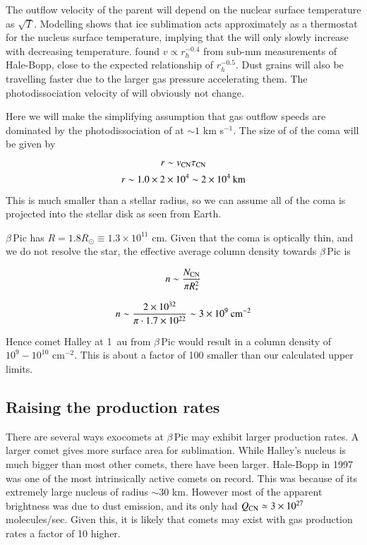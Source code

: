 \documentclass{aa}
\newcommand{\kms}{km s$^{-1}$}
\newcommand{\bp}{$\beta$\,Pic}
\begin{document}
The outflow velocity of the parent  will depend on the nuclear surface temperature as $\sqrt{T}$.
%
Modelling shows that ice sublimation acts approximately as a thermostat for the nucleus surface temperature, implying that the  will only slowly increase with decreasing temperature.
%
\citet{Biver99} found $v\propto r_h^{-0.4}$ from sub-mm measurements of Hale-Bopp, close to the expected relationship of $r_h^{-0.5}$.
%
Dust grains will also be travelling faster due to the larger gas pressure accelerating them.
%
The photodissociation velocity of  will obviously not change. 

Here we will make the simplifying assumption that gas outflow speeds are dominated by the photodissociation of  at $\sim 1$ \kms{}.
%
The size of of the  coma will be given by

$$r\sim v_{\ce{CN}} \tau_{\ce{CN}}$$
$$r\sim 1.0 \times 2\times 10^{4}\sim 2\times 10^{4}\:{\rm km}$$

This is much smaller than a stellar radius, so we can assume all of the coma is projected into the stellar disk as seen from Earth.

\bp{} has $R=1.8R_\odot\equiv 1.3\times 10^{11}$ cm.
%
Given that the coma is optically thin, and we do not resolve the star, the effective average column density towards \bp{} is 

$$n\sim\frac{N_{\ce{CN}}}{\pi R_*^2}$$

$$n\sim\frac{2\times10^{32}}{\pi\cdot 1.7\times10^{22}}\sim 3\times10^{9}\:{\rm cm^{-2}}$$

Hence comet Halley at 1~au from \bp{} would result in a  column density of $10^{9}-10^{10}$ cm$^{-2}$.
%
This is about a factor of 100 smaller than our calculated upper limits.

\subsection{Raising the  production rates}

There are several ways exocomets at \bp{} may exhibit larger  production rates.
%
A larger comet gives more surface area for sublimation.
%
While Halley's nucleus is much bigger than most other comets, there have been larger.
%
Hale-Bopp in 1997 was one of the most intrinsically active comets on record.
%
This was because of its extremely large nucleus of radius $\sim 30$ km.
%
However most of the apparent brightness was due to dust emission, and its only had $Q_{\ce{CN}}\simeq 3\times10^{27}$ molecules/sec.
%
Given this, it is likely that comets may exist with gas production rates a factor of 10 higher.
\end{document}
